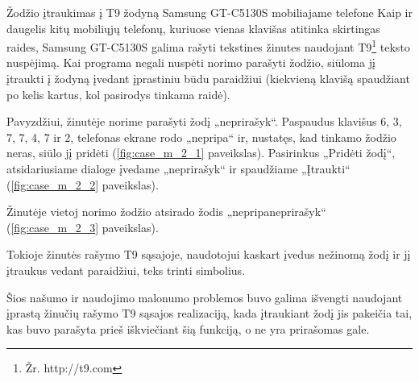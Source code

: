 \begin{xcase}{Žodžio įtraukimas į T9 žodyną Samsung GT-C5130S mobiliajame
              telefone}
  \xcgoal
  {
    Kaip ir daugelis kitų mobiliųjų telefonų, kuriuose vienas klavišas
    atitinka skirtingas raides, Samsung GT-C5130S galima rašyti tekstines
    žinutes naudojant T9\footnote{Žr. http://t9.com} teksto nuspėjimą. Kai
    programa negali nuspėti norimo parašyti žodžio, siūloma jį įtraukti į
    žodyną įvedant įprastiniu būdu paraidžiui (kiekvieną klavišą spaudžiant
    po kelis kartus, kol pasirodys tinkama raidė).
  }
  
  \xctools
  {
    Pavyzdžiui, žinutėje norime parašyti žodį „neprirašyk“. Paspaudus
    klavišus 6, 3, 7, 7, 4, 7 ir 2, telefonas ekrane rodo „nepripa“ ir,
    nustatęs, kad tinkamo žodžio neras, siūlo jį pridėti
    (\ref{fig:case_m_2_1} paveikslas). Pasirinkus „Pridėti žodį“,
    atsidariusiame dialoge įvedame „neprirašyk“ ir spaudžiame
    „Įtraukti“ (\ref{fig:case_m_2_2} paveikslas).
  }

  {
  }
  
  \xcresult
  {
    Žinutėje vietoj norimo žodžio atsirado žodis „nepripaneprirašyk“ (\ref{fig:case_m_2_3} paveikslas).
  }
  
  \xcprinciples
  {
    {
      Tokioje žinutės rašymo T9 sąsajoje, naudotojui kaskart įvedus nežinomą
      žodį ir jį įtraukus vedant paraidžiui, teks trinti simbolius.
    }
  }
  
  \xcthoughts
  {
    Šios našumo ir naudojimo malonumo problemos buvo galima išvengti
    naudojant įprastą žinučių rašymo T9 sąsajos realizaciją, kada įtraukiant
    žodį jis pakeičia tai, kas buvo parašyta prieš iškviečiant šią funkciją,
    o ne yra prirašomas gale.
  }
\end{xcase}
